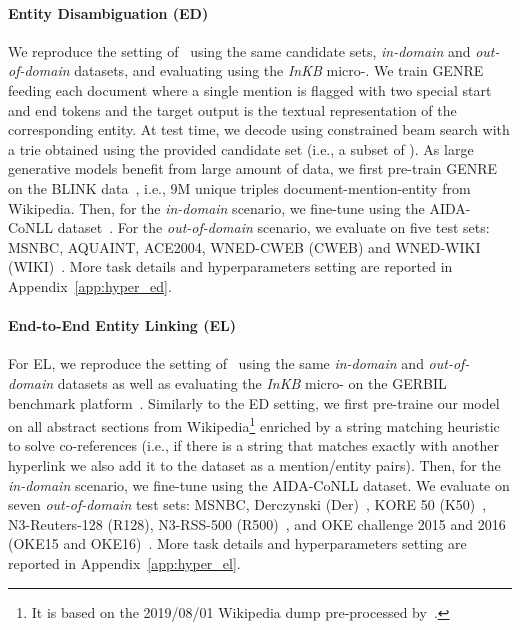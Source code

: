 \documentclass{article} \usepackage{main,times}
\makeatletter
\def\genre{\textsc{GENRE}\@\xspace}
\makeatother
\begin{document}
\paragraph{Entity Disambiguation (ED)}

We reproduce the setting of~\citet{le-titov-2018-improving} using the same candidate sets, \emph{in-domain} and \emph{out-of-domain} datasets, and evaluating using the \textit{InKB} micro-.
We train \genre feeding each document where a single mention is flagged with two special start and end tokens and the target output is the textual representation of the corresponding entity.
At test time,
we decode using constrained beam search with a trie obtained using the provided candidate set (i.e., a subset of ). As large generative models benefit from large amount of data, we first pre-train \genre on the BLINK data~\citep{wu-etal-2020-scalable}, i.e., 9M unique triples document-mention-entity
from Wikipedia. Then, for the \emph{in-domain} scenario, we fine-tune using the AIDA-CoNLL dataset~\citep{hoffart-etal-2011-robust}. For the \emph{out-of-domain} scenario, we evaluate on five test sets: MSNBC, AQUAINT, ACE2004, WNED-CWEB (CWEB) and WNED-WIKI (WIKI)~\citep{gabrilovich2013facc1, guo2018robust}. More task details and hyperparameters setting are reported in Appendix~\ref{app:hyper_ed}.

\paragraph{End-to-End Entity Linking (EL)}
For EL, we reproduce the setting of~\citet{kolitsas-etal-2018-end} using the same \emph{in-domain} and \emph{out-of-domain} datasets as well as evaluating the \textit{InKB} micro- on the GERBIL benchmark platform~\citep{roder2018gerbil}.
Similarly to the ED setting, we first pre-traine our model on all abstract sections from Wikipedia\footnote{It is based on the 2019/08/01 Wikipedia dump pre-processed by~\citet{petroni2020kilt}.} enriched by a string matching heuristic to solve co-references (i.e., if there is a string that matches exactly with another hyperlink we also add it to the dataset as a mention/entity pairs). Then, for the \emph{in-domain} scenario, we fine-tune using the AIDA-CoNLL dataset. We evaluate on seven \emph{out-of-domain} test sets: MSNBC, Derczynski (Der)~\citep{derczynski2015analysis}, KORE 50 (K50)~\citep{10.1145/2396761.2396832}, N3-Reuters-128 (R128), N3-RSS-500 (R500)~\citep{roder2014n3}, and OKE challenge 2015 and 2016 (OKE15 and OKE16)~\citep{nuzzolese2015open}. More task details and hyperparameters setting are reported in Appendix~\ref{app:hyper_el}.
\end{document}

